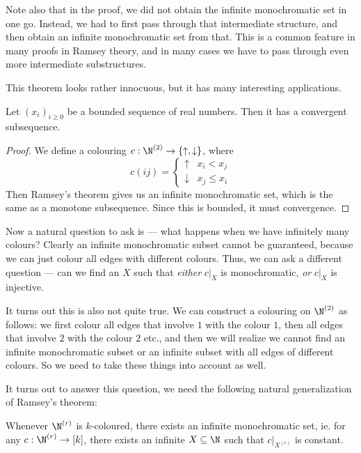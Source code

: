 \documentclass[a4paper]{article}
\begin{document}
Note also that in the proof, we did not obtain the infinite monochromatic set in one go. Instead, we had to first pass through that intermediate structure, and then obtain an infinite monochromatic set from that. This is a common feature in many proofs in Ramsey theory, and in many cases we have to pass through even more intermediate substructures.

This theorem looks rather innocuous, but it has many interesting applications.
\begin{cor}
  Let $(x_i)_{i \geq 0}$ be a bounded sequence of real numbers. Then it has a convergent subsequence.
\end{cor}

\begin{proof}
  We define a colouring $c: \N^{(2)} \to \{\uparrow, \downarrow\}$, where
  \[
    c(ij) =
    \begin{cases}
      \uparrow & x_i < x_j\\
      \downarrow & x_j \leq x_i
    \end{cases}
  \]
  Then Ramsey's theorem gives us an infinite monochromatic set, which is the same as a monotone subsequence. Since this is bounded, it must convergence.
\end{proof}

Now a natural question to ask is --- what happens when we have infinitely many colours? Clearly an infinite monochromatic subset cannot be guaranteed, because we can just colour all edges with different colours. Thus, we can ask a different question --- can we find an $X$ such that \emph{either} $c|_{X}$ is monochromatic, \emph{or} $c|_{X}$ is injective.

It turns out this is also not quite true. We can construct a colouring on $\N^{(2)}$ as follows: we first colour all edges that involve $1$ with the colour $1$, then all edges that involve $2$ with the colour $2$ etc., and then we will realize we cannot find an infinite monochromatic subset or an infinite subset with all edges of different colours. So we need to take these things into account as well.

It turns out to answer this question, we need the following natural generalization of Ramsey's theorem:
\begin{thm}
  Whenever $\N^{(r)}$ is $k$-coloured, there exists an infinite monochromatic set, ie. for any $c: \N^{(r)} \to [k]$, there exists an infinite $X \subseteq \N$ such that $c|_{X^{(r)}}$ is constant.
\end{thm}
\end{document}
